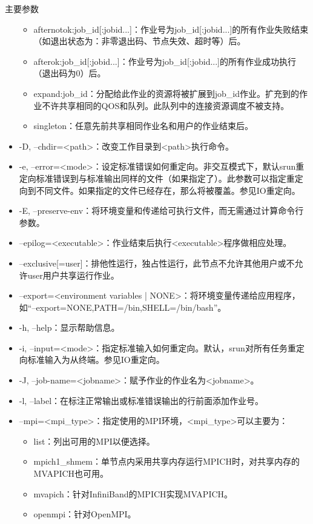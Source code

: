 \begin{frame}{主要参数}
\begin{itemize}
\begin{itemize}
    \item afternotok:job\_id[:jobid...]：作业号为job\_id[:jobid...]的所有作业失败结束（如退出状态为：非零退出码、节点失效、超时等）后。
    \item afterok:job\_id[:jobid...]：作业号为job\_id[:jobid...]的所有作业成功执行（退出码为0）后。
    \item expand:job\_id：分配给此作业的资源将被扩展到job\_id作业。扩充到的作业不许共享相同的QOS和队列。此队列中的连接资源调度不被支持。
    \item singleton：任意先前共享相同作业名和用户的作业结束后。
\end{itemize}
\item -D, --chdir=<path>：改变工作目录到<path>执行命令。
\item -e, --error=<mode>：设定标准错误如何重定向。非交互模式下，默认srun重定向标准错误到与标准输出同样的文件（如果指定了）。此参数可以指定重定向到不同文件。如果指定的文件已经存在，那么将被覆盖。参见IO重定向。
\item -E, --preserve-env：将环境变量和传递给可执行文件，而无需通过计算命令行参数。
\item --epilog=<executable>：作业结束后执行<executable>程序做相应处理。
\item --exclusive[=user]：排他性运行，独占性运行，此节点不允许其他用户或不允许user用户共享运行作业。
\item --export=<environment variables | NONE>：将环境变量传递给应用程序，如``--export=NONE,PATH=/bin,SHELL=/bin/bash''。
\item -h, --help：显示帮助信息。
\item -i, --input=<mode>：指定标准输入如何重定向。默认，srun对所有任务重定向标准输入为从终端。参见IO重定向。
\item -J, --job-name=<jobname>：赋予作业的作业名为<jobname>。
\item -l, --label：在标注正常输出或标准错误输出的行前面添加作业号。
\item --mpi=<mpi\_type>：指定使用的MPI环境，<mpi\_type>可以主要为：
\begin{itemize}
	\item list：列出可用的MPI以便选择。
	\item mpich1\_shmem：单节点内采用共享内存运行MPICH时，对共享内存的MVAPICH也可用。
	\item mvapich：针对InfiniBand的MPICH实现MVAPICH。
	\item openmpi：针对OpenMPI。

\end{itemize}
\end{itemize}
\end{frame}
